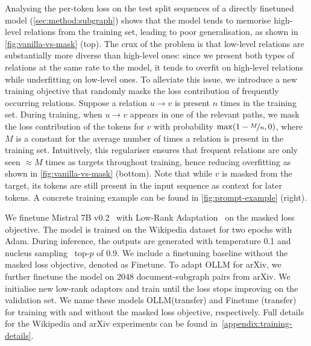 \documentclass{article}
\newcommand{\name}{{OLLM}\xspace}
\begin{document}
Analysing the per-token loss on the test split sequences of a directly finetuned model (\cref{sec:method:subgraph}) shows that the model tends to memorise high-level relations from the training set, leading to poor generalisation, as shown in \cref{fig:vanilla-vs-mask} (top).
The crux of the problem is that low-level relations are substantially more diverse than high-level ones: since we present both types of relations at the same rate to the model, it tends to overfit on high-level relations while underfitting on low-level ones.
To alleviate this issue, we introduce a new training objective that randomly masks the loss contribution of frequently occurring relations. Suppose a relation $u \to v$ is present $n$ times in the training set. During training, when $u \to v$ appears in one of the relevant paths, we mask the loss contribution of the tokens for $v$ with probability $\max(1 - \nicefrac{M}{n}, 0)$, where $M$ is a constant for the average number of times a relation is present in the training set. Intuitively, this regulariser ensures that frequent relations are only seen $\approx\!M$ times as targets throughout training, hence reducing overfitting as shown in \cref{fig:vanilla-vs-mask} (bottom). Note that while $v$ is masked from the target, its tokens are still present in the input sequence as context for later tokens. A concrete training example can be found in \cref{fig:prompt-example} (right).

We finetune Mistral 7B v0.2~\cite{jiang2023mistral} with Low-Rank Adaptation~\cite{hu2021lora} on the masked loss objective. The model is trained on the Wikipedia dataset for two epochs with Adam. During inference, the outputs are generated with temperature 0.1 and nucleus sampling~\cite{holtzman2019curious} top-$p$ of 0.9. We include a finetuning baseline without the masked loss objective, denoted as Finetune. To adapt \name for arXiv, we further finetune the model on 2048 document-subgraph pairs from arXiv. We initialise new low-rank adaptors and train until the loss stops improving on the validation set. We name these models \name (transfer) and Finetune (transfer) for training with and without the masked loss objective, respectively. Full details for the Wikipedia and arXiv experiments can be found in~\cref{appendix:training-details}.
\end{document}
